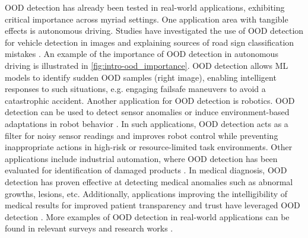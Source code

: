 OOD detection has already been tested in real-world applications, exhibiting critical importance across myriad settings. One application area with tangible effects is autonomous driving. Studies have investigated the use of OOD detection for vehicle detection in images and explaining sources of road sign classification mistakes \cite{nitsch2021out,eykholt2018robust,geiger2012we,muhammad2020deep}. An example of the importance of OOD detection in autonomous driving is illustrated in \ref{fig:intro-ood_importance}. OOD detection allows ML models to identify sudden OOD samples (right image), enabling intelligent responses to such situations, e.g. engaging failsafe maneuvers to avoid a catastrophic accident. Another application for OOD detection is robotics. OOD detection can be used to detect sensor anomalies or induce environment-based adaptations in robot behavior \cite{falcini2017deep,farid2022task}. In such applications, OOD detection acts as a filter for noisy sensor readings and improves robot control while preventing inappropriate actions in high-risk or resource-limited task environments. Other applications include industrial automation, where OOD detection has been evaluated for identification of damaged products \cite{bergmann2019mvtec}. In medical diagnosis, OOD detection has proven effective at detecting medical anomalies such as abnormal growths, lesions, etc. Additionally, applications improving the intelligibility of medical results for improved patient transparency and trust have leveraged OOD detection \cite{caruana2015intelligible,schlegl2019f}. More examples of OOD detection in real-world applications can be found in relevant surveys and research works \cite{yang2021generalized,farid2022task,filos2020can,zhang2021out}.

